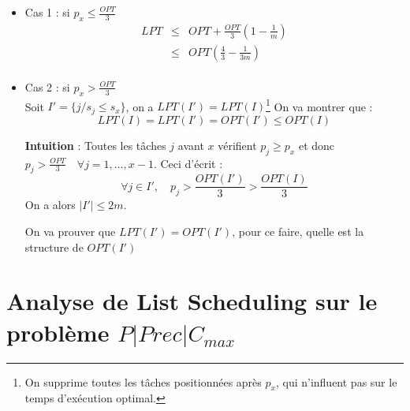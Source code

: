 \documentclass[a4paper, 11pt]{thesis}
\begin{document}
\begin{itemize}
    \item Cas 1 : si $p_x \leq \frac{OPT}{3}$\\
        \begin{displaymath} \begin{array}{rcl}
            LPT & \leq & OPT + \frac{OPT}{3} \left ( 1 - \frac{1}{m} \right ) \\
                & \leq & OPT \left( \frac{4}{3} - \frac{1}{3m} \right ) \\
        \end{array} \end{displaymath}
    \item Cas 2 : si $p_x > \frac{OPT}{3}$\\
        Soit $I' = \{j / s_j \leq s_x \}$, on a $LPT(I') = LPT(I)$\footnote{On supprime toutes les
        tâches positionnées après $p_x$, qui n'influent pas sur le temps d'exécution optimal.}
        On va montrer que : \begin{displaymath}
        LPT(I) = LPT(I') = OPT(I') \leq OPT(I) \end{displaymath}

        \textbf{Intuition} : Toutes les tâches $j$ avant $x$ vérifient $p_j \geq p_x$ et donc
        $p_j > \frac{OPT}{3} \quad \forall j = 1, \dots, x-1$. Ceci d'écrit : \begin{displaymath}
        \forall j \in I', \quad p_j > \frac{OPT(I')}{3} > \frac{OPT(I)}{3} \end{displaymath}
        On a alors $|I'| \leq 2m $.

        On va prouver que $LPT(I') = OPT(I')$, pour ce faire, quelle est la structure de $OPT(I')$

\end{itemize}

\section*{Analyse de List Scheduling sur le problème $P | Prec | C_{max}$}
\end{document}
